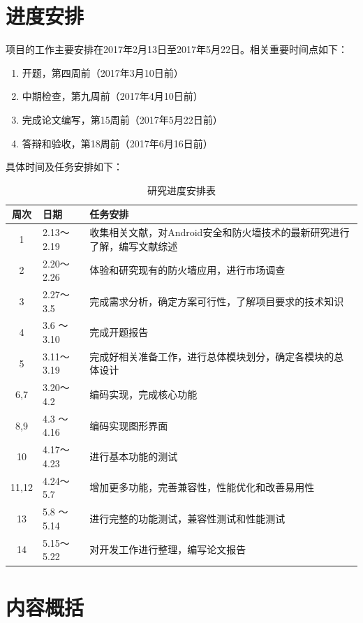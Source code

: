 \documentclass[format=final, language=chinese, degree=fyp]{hustthesis}
\begin{document}
\section{进度安排}

项目的工作主要安排在2017年2月13日至2017年5月22日。相关重要时间点如下：
\begin{enumerate}
	\item 开题，第四周前（2017年3月10日前）
	\item 中期检查，第九周前（2017年4月10日前）
	\item 完成论文编写，第15周前（2017年5月22日前）
	\item 答辩和验收，第18周前（2017年6月16日前）
\end{enumerate}

具体时间及任务安排如下：

\begin{table}[h!]
\centering
\caption{研究进度安排表}
	\begin{tabular}{|c|l|l|}\hline
	周次 	& 日期 & 任务安排\\\hline
	1		& 2.13～2.19 & 收集相关文献，对Android安全和防火墙技术的最新研究进行了解，编写文献综述\\\hline
	2		& 2.20～2.26 & 体验和研究现有的防火墙应用，进行市场调查\\\hline
	3		& 2.27～3.5  & 完成需求分析，确定方案可行性，了解项目要求的技术知识\\\hline
	4		& 3.6 ～3.10 & 完成开题报告\\\hline
	5		& 3.11～3.19 & 完成好相关准备工作，进行总体模块划分，确定各模块的总体设计\\\hline
	6,7		& 3.20～4.2  & 编码实现，完成核心功能\\\hline
	8,9 	& 4.3 ～4.16 & 编码实现图形界面\\\hline
	10		& 4.17～4.23 & 进行基本功能的测试\\\hline
	11,12	& 4.24～5.7  & 增加更多功能，完善兼容性，性能优化和改善易用性\\\hline
	13 		& 5.8 ～5.14 & 进行完整的功能测试，兼容性测试和性能测试\\\hline
	14 		& 5.15～5.22 & 对开发工作进行整理，编写论文报告\\\hline
	\end{tabular}	
\end{table}


\section{内容概括}
\end{document}
